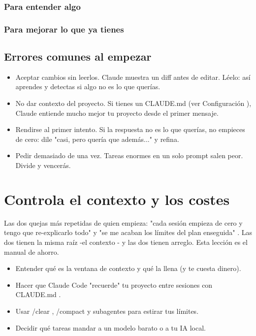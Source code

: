 \documentclass[11pt,a4paper]{book}
\begin{document}
\subsection{Para entender algo}
\subsection{Para mejorar lo que ya tienes}
\section{Errores comunes al empezar}
\begin{itemize}\item Aceptar cambios sin leerlos. Claude muestra un diff antes de editar. Léelo: así aprendes y detectas si algo no es lo que querías.\end{itemize}
\begin{itemize}\item No dar contexto del proyecto. Si tienes un CLAUDE.md (ver Configuración ), Claude entiende mucho mejor tu proyecto desde el primer mensaje.\end{itemize}
\begin{itemize}\item Rendirse al primer intento. Si la respuesta no es lo que querías, no empieces de cero: dile "casi, pero quería que además..." y refina.\end{itemize}
\begin{itemize}\item Pedir demasiado de una vez. Tareas enormes en un solo prompt salen peor. Divide y vencerás.\end{itemize}
\chapter{Controla el contexto y los costes}
Las dos quejas más repetidas de quien empieza: "cada sesión empieza de cero y tengo que re-explicarlo todo" y "se me acaban los límites del plan enseguida" . Las dos tienen la misma raíz -el contexto - y las dos tienen arreglo. Esta lección es el manual de ahorro.

\begin{itemize}\item Entender qué es la ventana de contexto y qué la llena (y te cuesta dinero).\end{itemize}
\begin{itemize}\item Hacer que Claude Code "recuerde" tu proyecto entre sesiones con CLAUDE.md .\end{itemize}
\begin{itemize}\item Usar /clear , /compact y subagentes para estirar tus límites.\end{itemize}
\begin{itemize}\item Decidir qué tareas mandar a un modelo barato o a tu IA local.\end{itemize}
\end{document}
